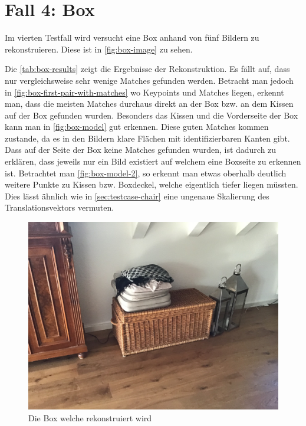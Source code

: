 \section{Fall 4: Box}
\label{sec:testcase-box}
Im vierten Testfall wird versucht eine Box anhand von fünf Bildern zu rekonstruieren.
Diese ist in \autoref{fig:box-image} zu sehen.

Die \autoref{tab:box-results} zeigt die Ergebnisse der Rekonstruktion.
Es fällt auf, dass nur vergleichsweise sehr wenige Matches gefunden werden.
Betracht man jedoch in \autoref{fig:box-first-pair-with-matches} wo Keypoints und Matches liegen, erkennt man, dass die meisten Matches durchaus direkt an der Box bzw. an dem Kissen auf der Box gefunden wurden.
Besonders das Kissen und die Vorderseite der Box kann man in \autoref{fig:box-model} gut erkennen.
Diese guten Matches kommen zustande, da es in den Bildern klare Flächen mit identifizierbaren Kanten gibt.
Dass auf der Seite der Box keine Matches gefunden wurden, ist dadurch zu erklären, dass jeweils nur ein Bild existiert auf welchem eine Boxseite zu erkennen ist.
Betrachtet man \autoref{fig:box-model-2}, so erkennt man etwas oberhalb deutlich weitere Punkte zu Kissen bzw. Boxdeckel, welche eigentlich tiefer liegen müssten.
Dies lässt ähnlich wie in \autoref{sec:testcase-chair} eine ungenaue Skalierung des Translationsvektors vermuten.

\begin{figure}
    \includegraphics[width=\textwidth]{src/img/box.jpg}
    \caption{Die Box welche rekonstruiert wird}
    \label{fig:box-image}
\end{figure}

